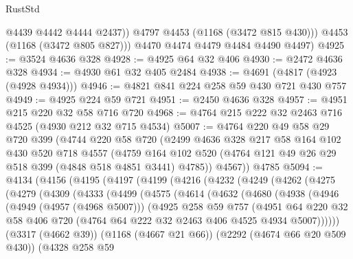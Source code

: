 \begin{lexlean}{RustStd}
\begin{coremodule}
              @4439
              @4442
              @4444
              @2437))
          @4797
          @4453
          (@1168 (@3472 @815 @430)))
        @4453
        (@1168 (@3472 @805 @827)))
      @4470
      @4474
      @4479
      @4484
      @4490
      @4497)
@4925 := @3524 @4636 @328
@4928 := @4925 @64 @32 @406
@4930 := @2472 @4636 @328
@4934 := @4930 @61 @32 @405 @2484
@4938 := @4691 (@4817 (@4923 (@4928 @4934)))
@4946 := @4821 @841 @224 @258 @59 @430 @721 @430 @757
@4949 := @4925 @224 @59 @721
@4951 := @2450 @4636 @328
@4957 := @4951 @215 @220 @32 @58 @716 @720
@4968 := @4764 @215 @222 @32 @2463 @716 @4525 (@4930 @212 @32 @715 @4534)
@5007 := @4764
    @220
    @49
    @58
    @29
    @720
    @399
    (@4744
      @220
      @58
      @720
      (@2499
        @4636
        @328
        @217
        @58
        @164
        @102
        @430
        @520
        @718
        @4557
        (@4759 @164 @102 @520 (@4764 @121 @49 @26 @29 @518 @399 (@4848 @518 @4851 @3441) @4785))
        @4567))
    @4785
@5094 := @4134
    (@4156
      (@4195
        (@4197
          (@4199
            (@4216
              (@4232
                (@4249
                  (@4262
                    (@4275
                      (@4279
                        (@4309
                          (@4333
                            (@4499
                              (@4575
                                (@4614
                                  (@4632
                                    (@4680
                                      (@4938
                                        (@4946
                                          (@4949 (@4957 (@4968 @5007)))
                                          (@4925
                                            @258
                                            @59
                                            @757
                                            (@4951
                                              @64
                                              @220
                                              @32
                                              @58
                                              @406
                                              @720
                                              (@4764 @64 @222 @32 @2463 @406 @4525 @4934 @5007))))))
                                    (@3317 (@4662 @39))
                                    (@1168 (@4667 @21 @66))
                                    (@2292 (@4674 @66 @20 @509 @430))
                                    (@4328
                                      @258
                                      @59

\end{coremodule}
\end{lexlean}
